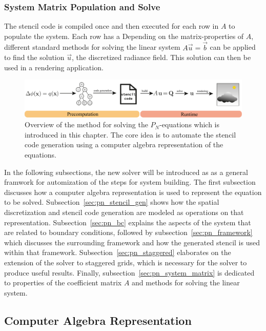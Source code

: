 \subsubsection*{System Matrix Population and Solve}
The stencil code is compiled once and then executed for each row in $A$ to populate the system. Each row has a Depending on the matrix-properties of $A$, different standard methods for solving the linear system $A\vec{u}=\vec{b}$ can be applied to find the solution $\vec{u}$, the discretized radiance field. This solution can then be used in a rendering application.
\begin{figure}[h]
\centering
\includegraphics[width=1.0\textwidth]{04_pn_method/figures/fig_pipeline.pdf}
\caption{Overview of the method for solving the $P_N$-equations which is introduced in this chapter. The core idea is to automate the stencil code generation using a computer algebra representation of the equations.}
\label{fig:pn_solver_stencil_overview}
\end{figure}

In the following subsections, the new solver will be introduced as as a general framwork for automization of the steps for system building. The first subsection discusses how a computer algebra representation is used to represent the equation to be solved. Subsection~\ref{sec:pn_stencil_gen} shows how the spatial discretization and stencil code generation are modeled as operations on that representation. Subsection~\ref{sec:pn_bc} explains the aspects of the system that are related to boundary conditions, followed by subsection~\ref{sec:pn_framework} which discusses the surrounding framework and how the generated stencil is used within that framework. Subsection~\ref{sec:pn_staggered} elaborates on the extension of the solver to staggered grids, which is necessary for the solver to produce useful results. Finally, subsection~\ref{sec:pn_system_matrix} is dedicated to properties of the coefficient matrix $A$ and methods for solving the linear system.

\subsection{Computer Algebra Representation}
\label{sec:pn_car}

